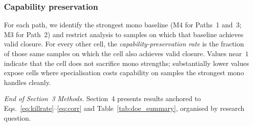 \subsubsection{Capability preservation}

For each path, we identify the strongest mono baseline (M4 for Paths~1 and~3; M3 for Path~2) and restrict analysis to samples on which that baseline achieves valid closure. For every other cell, the \emph{capability-preservation rate} is the fraction of those same samples on which the cell also achieves valid closure. Values near~$1$ indicate that the cell does not sacrifice mono strengths; substantially lower values expose cells where specialisation costs capability on samples the strongest mono handles cleanly.


\emph{End of Section~3 Methods.} Section~4 presents results anchored to Eqs.~\ref{eq:killrate}--\ref{eq:corr} and Table~\ref{tab:doe_summary}, organised by research question.
